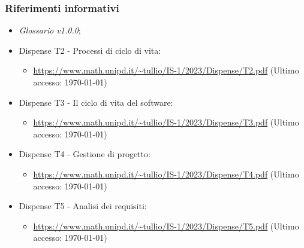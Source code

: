 \documentclass[8pt]{article}
\begin{document}
\subsubsection{Riferimenti informativi}
\begin{itemize}
\setlength\itemsep{0em}
    \item \textit{Glossario v1.0.0};
	\item Dispense T2 - Processi di ciclo di vita:
	\begin{itemize}
		\item
        \href{https://www.math.unipd.it/~tullio/IS-1/2023/Dispense/T2.pdf}{https://www.math.unipd.it/\textasciitilde{}tullio/IS-1/2023/Dispense/T2.pdf} (Ultimo accesso: \today)
	\end{itemize}
	\item Dispense T3 - Il ciclo di vita del software:
	\begin{itemize}
		\item
        \href{https://www.math.unipd.it/~tullio/IS-1/2023/Dispense/T3.pdf}{https://www.math.unipd.it/\textasciitilde{}tullio/IS-1/2023/Dispense/T3.pdf} (Ultimo accesso: \today)
	\end{itemize}
	\item Dispense T4 - Gestione di progetto:
	\begin{itemize}
		\item
        \href{https://www.math.unipd.it/~tullio/IS-1/2023/Dispense/T4.pdf}{https://www.math.unipd.it/\textasciitilde{}tullio/IS-1/2023/Dispense/T4.pdf} (Ultimo accesso: \today)
	\end{itemize}
\item Dispense T5 - Analisi dei requisiti:
	\begin{itemize}
		\item
        \href{https://www.math.unipd.it/~tullio/IS-1/2023/Dispense/T5.pdf}{https://www.math.unipd.it/\textasciitilde{}tullio/IS-1/2023/Dispense/T5.pdf} (Ultimo accesso: \today)
	\end{itemize}
    \end{itemize}

\clearpage
\end{document}
